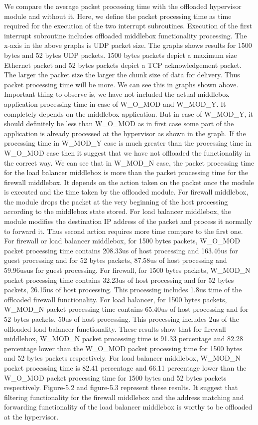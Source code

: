 \documentclass[a4paper,11pt]{report}
\begin{document}
We compare the average packet processing time with the offloaded hypervisor module and without it. Here, we define the packet processing time as time required for the execution of the two interrupt subroutines. Execution of the first interrupt subroutine includes offloaded middlebox functionality processing. The x-axis in the above graphs is UDP packet size. The graphs shows results for 1500 bytes and 52 bytes UDP packets. 1500 bytes packets depict a maximum size Ethernet packet and 52 bytes packets depict a TCP acknowledgement packet. The larger the packet size the larger the chunk size of data for delivery. Thus packet processing time will be more. We can see this in graphs shown above. Important thing to observe is, we have not included the actual middlebox application processing time in case of W\_O\_MOD and W\_MOD\_Y. It completely depends on the middlebox application. But in case of W\_MOD\_Y, it should definitely be less than W\_O\_MOD as in first case some part of the application is already processed at the hypervisor as shown in the graph. If the processing time in W\_MOD\_Y case is much greater than the processing time in W\_O\_MOD case then it suggest that we have not offloaded the functionality in the correct way. We can see that in W\_MOD\_N case, the packet processing time for the load balancer middlebox is more than the packet processing time for the firewall middlebox. It depends on the action taken on the packet once the module is executed and the time taken by the offloaded module. For firewall middlebox, the module drops the packet at the very beginning of the host processing according to the middlebox state stored. For load balancer middlebox, the module modifies the destination IP address of the packet and process it normally to forward it. Thus second action requires more time compare to the first one. For firewall or load balancer middlebox, for 1500 bytes packets, W\_O\_MOD packet processing time contains 208.33us of host processing and 163.46us for guest processing and for 52 bytes packets, 87.58us of host processing and 59.96usus for guest processing. For firewall, for 1500 bytes packets, W\_MOD\_N packet processing time contains 32.23us of host processing and for 52 bytes packets, 26.15us of host processing. This processing includes 1.8us time of the offloaded firewall functionality. For load balancer, for 1500 bytes packets, W\_MOD\_N packet processing time contains 65.40us of host processing and for 52 bytes packets, 50us of host processing. This processing includes 2us of the offloaded load balancer functionality. These results show that for firewall middlebox, W\_MOD\_N packet processing time is 91.33 percentage and 82.28 percentage lower than the W\_O\_MOD packet processing time for 1500 bytes and 52 bytes packets respectively. For load balancer middlebox, W\_MOD\_N packet processing time is 82.41 percentage and 66.11 percentage lower than the W\_O\_MOD packet processing time for 1500 bytes and 52 bytes packets respectively. Figure-5.2 and figure-5.3 represent these results. It suggest that filtering functionality for the firewall middlebox and the address matching and forwarding functionality of the load balancer middlebox is worthy to be offloaded at the hypervisor. 
\end{document}
